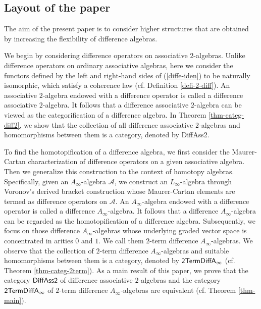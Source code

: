 \documentclass[a4paper,reqno,10pt]{amsart}
\theoremstyle{plain}
\theoremstyle{definition}
\theoremstyle{remark}
\begin{document}
\subsection{Layout of the paper} The aim of the present paper is to consider higher structures that are obtained by increasing the flexibility of difference algebras.

\medskip

We begin by considering difference operators on associative $2$-algebras. Unlike difference operators on ordinary associative algebras, here we consider the functors defined by the left and right-hand sides of (\ref{diffe-iden}) to be naturally isomorphic, which satisfy a coherence law (cf. Definition \ref{defi-2-diff}). An associative $2$-algebra endowed with a difference operator is called a difference associative $2$-algebra. It follows that a difference associative $2$-algebra can be viewed as the categorification of a difference algebra. In Theorem \ref{thm-categ-diff2}, we show that the collection of all difference associative $2$-algebras and homomorphisms between them is a category, denoted by {\sf DiffAss2}.

\medskip

To find the homotopification of a difference algebra, we first consider the Maurer-Cartan characterization of difference operators on a given associative algebra. Then we generalize this construction to the context of homotopy algebras. Specifically, given an $A_\infty$-algebra $\mathcal{A}$, we construct an $L_\infty$-algebra through Voronov's derived bracket construction whose Maurer-Cartan elements are termed as difference operators on $\mathcal{A}$. An $A_\infty$-algebra endowed with a difference operator is called a difference $A_\infty$-algebra. It follows that a difference $A_\infty$-algebra can be regarded as the homotopification of a difference algebra. Subsequently, we focus on those difference $A_\infty$-algebras whose underlying graded vector space is concentrated in arities $0$ and $1$. We call them $2$-term difference $A_\infty$-algebras. We observe that the collection of $2$-term difference $A_\infty$-algebras and suitable homomorphisms between them is a category, denoted by ${\sf 2TermDiffA_\infty}$ (cf. Theorem \ref{thm-categ-2term}). As a main result of this paper, we prove that the category ${\sf DiffAss2}$ of difference associative $2$-algebras and the category ${\sf 2TermDiffA_\infty}$ of $2$-term difference $A_\infty$-algebras are equivalent (cf. Theorem \ref{thm-main}).

\end{document}

